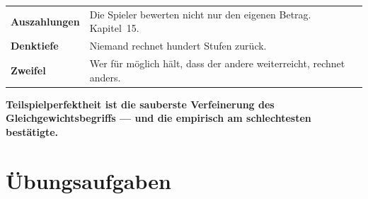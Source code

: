 \begin{warnung}
\begin{center}
{\small
\renewcommand{\arraystretch}{1.5}
\begin{tabular}{@{}P{2.4cm}P{6.2cm}@{}}
\toprule
\textbf{Auszahlungen} & Die Spieler bewerten nicht nur den eigenen Betrag. Kapitel~15.\\
\textbf{Denktiefe} & Niemand rechnet hundert Stufen zurück.\\
\textbf{Zweifel} & Wer für möglich hält, dass der andere weiterreicht, rechnet anders.\\
\bottomrule
\end{tabular}}
\end{center}

\begin{center}
\begin{minipage}{0.88\textwidth}
\end{minipage}
\end{center}

\begin{center}
\begin{minipage}{0.9\textwidth}
\textbf{Teilspielperfektheit ist die sauberste Verfeinerung des Gleichgewichtsbegriffs --- und die empirisch am schlechtesten bestätigte.}
\end{minipage}
\end{center}
\end{warnung}

\section{Übungsaufgaben}

